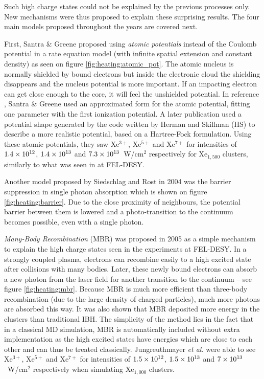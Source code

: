 Such high charge states could not be explained by the previous processes only.
New mechanisms were thus proposed to explain these surprising results.
The four main models proposed throughout the years are covered next.



First, Santra \& Greene proposed using \textit{atomic potentials} instead of
the Coulomb potential in a rate equation model (with infinite
spatial
%
extension and
constant density) as seen on figure \ref{fig:heating:atomic_pot}.
The atomic nucleus is normally shielded by bound electrons but inside the
electronic cloud the shielding disappears and the nucleus potential is more
important. If an impacting electron can get close enough to the core, it will
feel the unshielded potential.
In reference \cite{Greene2003}, Santra \& Greene used an approximated form for
the atomic potential, fitting one parameter with the first ionization potential.
A later\cite{Walters2006} publication used a
potential shape generated by the code written by Herman and
Skillman\cite{HS1963} (HS) to describe a more
realistic
%
potential, based on a
Hartree-Fock formulation. Using these atomic potentials, they saw Xe$^{3+}$,
Xe$^{5+}$ and Xe$^{7+}$ for intensities of $\ten{1.4}{12}$, $\ten{1.4}{13}$ and
$\ten{7.3}{13}$~W/cm$^2$ respectively for Xe$_{1,500}$ clusters, similarly to
what was seen in at FEL-DESY.



Another model proposed by Siedschlag and Rost\cite{Siedschlag2004} in 2004 was
the barrier suppression in single photon absorption which is shown on figure
\ref{fig:heating:barrier}. Due to the close proximity
of neighbours, the potential barrier between them is lowered and
a photo-transition to the continuum becomes possible, even with a single photon.



\textit{Many-Body Recombination} (MBR) was proposed in 2005\cite{Jungreuthmayer2005}
as a simple mechanism to explain the high charge states seen in the
experiments at FEL-DESY. In a strongly coupled plasma, electrons can recombine
easily to a high excited
state after collisions with many bodies. Later, these newly bound electrons can
absorb a new photon from the laser field for another transition to the
continuum -- see figure \ref{fig:heating:mbr}.
Because MBR is much more efficient than three-body
recombination (due to the large density of charged particles), much more
photons are absorbed this way. It was also shown that MBR deposited more energy
in the clusters than traditional IBH.
The simplicity of the
method lies in the fact that in a classical MD simulation, MBR is automatically
included without extra implementation as the high excited states have energies
which are close to each other and can thus be treated classically.
Jungreuthmayer \textit{et al.} were able
to see Xe$^{3+}$, Xe$^{5+}$ and Xe$^{7+}$ for intensities of $\ten{1.5}{12}$,
$\ten{1.5}{13}$ and $\ten{7}{13}$~W/cm$^2$ respectively when simulating
Xe$_{1,000}$ clusters.


